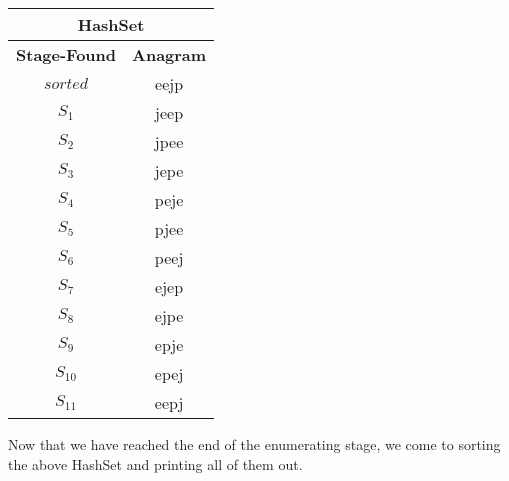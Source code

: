 \documentclass[12pt]{article}
\begin{document}
\begin{center}
\begin{tabular}{ |c|c| }
    \hline
    \multicolumn{2}{|c|}{HashSet} \\
    \hline
    \textbf{Stage-Found} & \textbf{Anagram} \\
    \hline
    $sorted$ & eejp \\
    \hline
    $S_1$ & jeep \\
    \hline
    $S_2$ & jpee \\
    \hline
    $S_3$ & jepe \\
    \hline
    $S_4$ & peje \\
    \hline
    $S_5$ & pjee \\
    \hline
    $S_6$ & peej \\
    \hline
    $S_7$ & ejep \\
    \hline
    $S_8$ & ejpe \\
    \hline
    $S_9$ & epje \\
    \hline
    $S_{10}$ & epej \\
    \hline
    $S_{11}$ & eepj \\
    \hline
\end{tabular}
\end{center}

Now that we have reached the end of the enumerating stage, we come to sorting the above HashSet and printing all of
them out.

\end{document}
